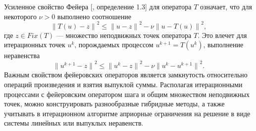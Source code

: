 Усиленное свойство Фейера [\cite{VasEre2009}, определение 1.3] для оператора $T$ означает, что для некоторого $\nu>0$ выполнено соотношение
\begin{equation}\label{fejer_prop_uni}
{\|T(u)-z\|}^2\le{\|u-z\|}^2-\nu{\|u-T(u)\|}^2,
\end{equation}
где $z\in Fix(T)$ --- множество неподвижных точек оператора $T$. Это влечет для итерационных точек $u^k$, порождаемых процессом $u^{k+1}=T(u^k)$, выполнение неравенства
\begin{equation}\label{fejer_prop_it}
{\|u^{k+1}-z\|}^2\le{\|u^k-z\|}^2-\nu{\|u^k-u^{k+1}\|}^2.
\end{equation}
Важным свойством фейеровских операторов является замкнутость относительно операций произведения и взятия выпуклой суммы. Располагая итерационными процессами с фейеровским оператором шага и общим множеством неподвижных точек, можно конструировать разнообразные гибридные методы, а также учитывать в итерационном алгоритме априорные ограничения на решение в виде системы линейных или выпуклых неравенств.

